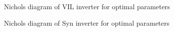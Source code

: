 \begin{figure}[ht]
    \centering
     \nonindent
	\caption[Nichols diagram of \gls{VIL} inverter]{Nichols diagram of \gls{VIL} inverter for optimal parameters}
	\label{res:VILNichols}
\end{figure}

\begin{figure}[ht]
    \centering
     \nonindent
	\caption[Nichols diagram of of \gls{Syn} inverter]{Nichols diagram of \gls{Syn} inverter for optimal parameters}
	\label{res:SynNichols}
\end{figure}

